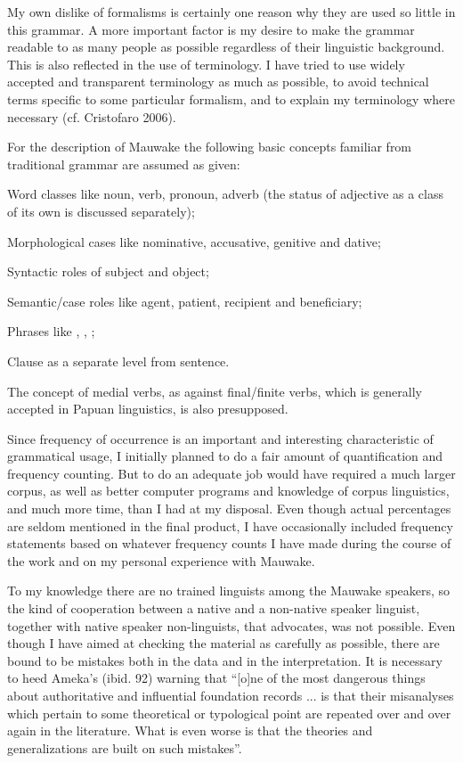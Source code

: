 My own dislike of formalisms is certainly one reason why they are used so little in this grammar.  A more important factor is my desire to make the grammar readable to as many people as possible regardless of their linguistic background. This is also reflected in the use of terminology. I have tried to use widely accepted and transparent terminology as much as possible, to avoid technical terms specific to some particular formalism, and to explain my terminology where necessary (cf. Cristofaro 2006). 

For the description of Mauwake the following basic concepts familiar from traditional grammar are assumed as given:

Word classes like noun, verb, pronoun, adverb (the status of adjective as a class of its own is discussed separately);

Morphological cases like nominative, accusative, genitive and dative;

Syntactic roles of subject and object;

Semantic/case roles like agent, patient, recipient and beneficiary;

Phrases like , , ;

Clause as a separate level from sentence. 

The concept of medial verbs, as against final/finite verbs, which is generally accepted in Papuan linguistics, is also presupposed. 

Since frequency of occurrence is an important and interesting characteristic of grammatical usage, I initially planned to do a fair amount of quantification and frequency counting.  But to do an adequate job would have required a much larger corpus, as well as better computer programs and knowledge of corpus linguistics, and much more time, than I had at my disposal. Even though actual percentages are seldom mentioned in the final product, I have occasionally included frequency statements based on whatever frequency counts I have made during the course of the work and on my personal experience with Mauwake. 

To my knowledge there are no trained linguists among the Mauwake speakers, so the kind of cooperation between a native and a non-native speaker linguist, together with native speaker non-linguists, that \citet{Ameka2006} advocates, was not possible.  Even though I have aimed at checking the material as carefully as possible, there are bound to be mistakes both in the data and in the interpretation. It is necessary to heed Ameka's (ibid. 92) warning that ``[o]ne of the most dangerous things about authoritative and influential foundation records ... is that their misanalyses which pertain to some theoretical or typological point are repeated over and over again in the literature.  What is even worse is that the theories and generalizations are built on such mistakes''. 

